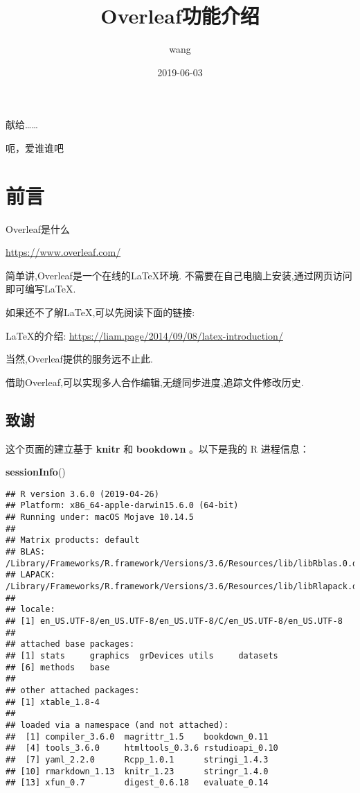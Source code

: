 \documentclass[]{ctexbook}
\title{Overleaf功能介绍}
\author{wang}
\date{2019-06-03}
\newenvironment{Shaded}{\begin{snugshade}}{\end{snugshade}}
\newcommand{\KeywordTok}[1]{\textcolor[rgb]{0.13,0.29,0.53}{\textbf{#1}}}
\newcommand{\NormalTok}[1]{#1}
\begin{document}
\maketitle


\thispagestyle{empty}

\begin{center}
献给……

呃，爱谁谁吧
\end{center}

\setlength{\abovedisplayskip}{-5pt}
\setlength{\abovedisplayshortskip}{-5pt}

{
\setcounter{tocdepth}{2}
\tableofcontents
}
\listoftables
\listoffigures
\hypertarget{section}{%
\chapter*{前言}\label{section}}


Overleaf是什么

\url{https://www.overleaf.com/}

简单讲,Overleaf是一个在线的LaTeX环境.
不需要在自己电脑上安装,通过网页访问即可编写LaTeX.

如果还不了解LaTeX,可以先阅读下面的链接:

LaTeX的介绍:
\url{https://liam.page/2014/09/08/latex-introduction/}

当然,Overleaf提供的服务远不止此.

借助Overleaf,可以实现多人合作编辑,无缝同步进度,追踪文件修改历史.

\hypertarget{section-1}{%
\section*{致谢}\label{section-1}}


这个页面的建立基于 \textbf{knitr} \citep{xie2015} 和 \textbf{bookdown} \citep{R-bookdown}。以下是我的 R 进程信息：

\begin{Shaded}
\begin{Highlighting}[]
\KeywordTok{sessionInfo}\NormalTok{()}
\end{Highlighting}
\end{Shaded}

\begin{verbatim}
## R version 3.6.0 (2019-04-26)
## Platform: x86_64-apple-darwin15.6.0 (64-bit)
## Running under: macOS Mojave 10.14.5
## 
## Matrix products: default
## BLAS:   /Library/Frameworks/R.framework/Versions/3.6/Resources/lib/libRblas.0.dylib
## LAPACK: /Library/Frameworks/R.framework/Versions/3.6/Resources/lib/libRlapack.dylib
## 
## locale:
## [1] en_US.UTF-8/en_US.UTF-8/en_US.UTF-8/C/en_US.UTF-8/en_US.UTF-8
## 
## attached base packages:
## [1] stats     graphics  grDevices utils     datasets 
## [6] methods   base     
## 
## other attached packages:
## [1] xtable_1.8-4
## 
## loaded via a namespace (and not attached):
##  [1] compiler_3.6.0  magrittr_1.5    bookdown_0.11  
##  [4] tools_3.6.0     htmltools_0.3.6 rstudioapi_0.10
##  [7] yaml_2.2.0      Rcpp_1.0.1      stringi_1.4.3  
## [10] rmarkdown_1.13  knitr_1.23      stringr_1.4.0  
## [13] xfun_0.7        digest_0.6.18   evaluate_0.14
\end{verbatim}
\end{document}

